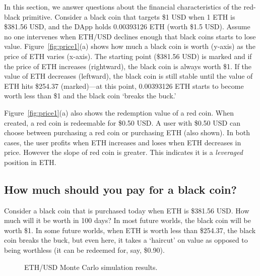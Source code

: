In this section, we answer questions about the financial characteristics of the red-black primitive. Consider a black coin that targets \$1 USD when 1 ETH is \$381.56 USD, and the DApp holds 0.00393126 ETH (worth \$1.5 USD).  Assume no one intervenes when ETH/USD declines enough that black coins starts to lose value. Figure~\ref{fig:price1}(a) shows how much a black coin is worth (y-axis) as the price of ETH varies (x-axis). The starting point (\$381.56 USD) is marked and if the price of ETH increases (rightward), the black coin is always worth \$1. If the value of ETH decreases (leftward), the black coin is still stable until the value of ETH hits \$254.37 (marked)---at this point, 0.00393126 ETH starts to become worth less than \$1 and the black coin `breaks the buck.'

Figure~\ref{fig:price1}(a) also shows the redemption value of a red coin. When created, a red coin is redeemable for \$0.50 USD. A user with \$0.50 USD can choose between purchasing a red coin or purchasing ETH (also shown). In both cases, the user profits when ETH increases and loses when ETH decreases in price. However the slope of red coin is greater. This indicates it is a \emph{leveraged} position in ETH.  


\subsection{How much should you pay for a black coin?}

Consider a black coin that is purchased today when ETH is \$381.56 USD. How much will it be worth in 100 days? In most future worlds, the black coin will be worth \$1. In some future worlds, when ETH is worth less than \$254.37, the black coin breaks the buck, but even here, it takes a `haircut' on value as opposed to being worthless (\eg it can be redeemed for, say, \$0.90). 

\begin{figure}[t]
    \centering
        \qquad
    \caption{ETH/USD Monte Carlo simulation results. \label{fig:sim}}
\end{figure}

